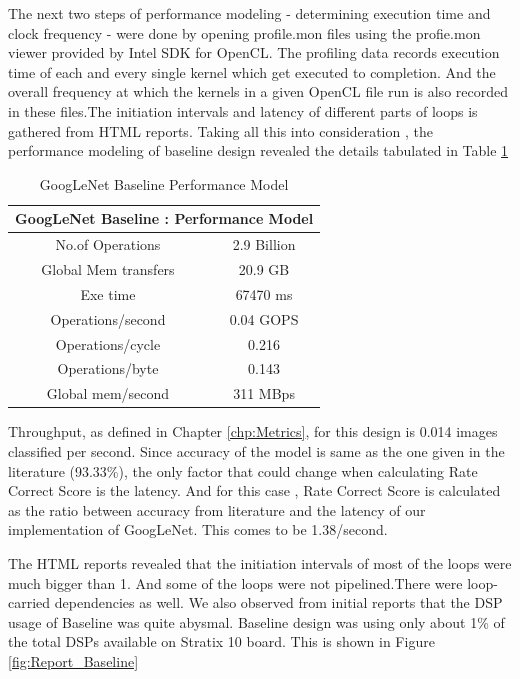 The next two steps of performance modeling - determining execution time and clock frequency - were done by opening profile.mon files using the profie.mon viewer provided by Intel SDK for OpenCL. The profiling data records execution time of each and every single kernel which get executed to completion. And the overall frequency at which the kernels in a given OpenCL file run is also recorded in these files.The initiation intervals and latency of different parts of loops is gathered from HTML reports. Taking all this into consideration , the performance modeling of baseline design revealed the details tabulated in Table \ref{tab:GoogLeNetBaselinePerfModel} 
\begin{table}[!htb]                          
 \centering
    \begin{tabular}{|c|c|}
    \multicolumn{2}{c}{\textbf{GoogLeNet Baseline : Performance Model}} \\ \hline

     No.of Operations    &   2.9 Billion \\ \hline
      Global Mem transfers &   20.9 GB            \\ \hline          
      Exe time    &  67470 ms    \\ \hline
      Operations/second   &   0.04 GOPS \\ \hline
      Operations/cycle &   0.216             \\ \hline
      Operations/byte       &   0.143     \\ \hline
      Global mem/second & 311 MBps  \\ \hline

    \end{tabular}
    \caption{GoogLeNet Baseline Performance Model}
    \label{tab:GoogLeNetBaselinePerfModel}                            

\end{table}  

Throughput, as defined in Chapter \ref{chp:Metrics}, for this design is 0.014 images classified per second. Since accuracy of the model is same as the one given in the literature (93.33\%), the only factor that could change when calculating Rate Correct Score is the latency. And for this case , Rate Correct Score is calculated as the ratio between accuracy from literature and the latency of our implementation of GoogLeNet. This comes to be  1.38/second.

The HTML reports revealed that the initiation intervals of most of the loops were much bigger than 1. And some of the loops were not pipelined.There were loop-carried dependencies as well. We also observed from initial reports that the DSP usage of Baseline was quite abysmal. Baseline design was using only about 1\% of the total DSPs available on Stratix 10 board. This is shown in Figure \ref{fig:Report_Baseline}   


